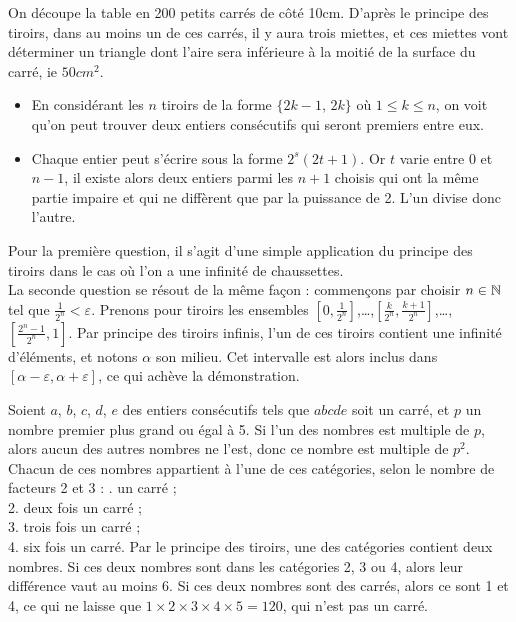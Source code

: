\begin{sol}
On découpe la table en 200 petits carrés de côté 10cm. D'après le principe des tiroirs, dans au moins un de ces carrés, il y aura trois miettes, et ces miettes vont déterminer un triangle dont l'aire sera inférieure à la moitié de la surface du carré, ie $50cm^2$.
\end{sol}


\begin{sol}
\begin{itemize}
    \item En considérant les $n$ tiroirs de la forme $\{2k-1, \, 2k\}$ où $1 \le k \le n$, on voit qu'on peut trouver deux entiers consécutifs qui seront premiers entre eux.
    \item Chaque entier peut s'écrire sous la forme $2^s(2t+1)$. Or $t$ varie entre $0$ et $n-1$, il existe alors deux entiers parmi les $n + 1$ choisis qui ont la même partie impaire et qui ne diffèrent que par la puissance de 2. L'un divise donc l'autre.
\end{itemize}
\end{sol}


\begin{sol}
Pour la première question, il s'agit d'une simple application du principe des tiroirs dans le cas où l'on a une infinité de chaussettes.\\
La seconde question se résout de la même façon : commençons par choisir $n\in\mathbb N$ tel que $\frac{1}{2^n}<\varepsilon$. Prenons pour tiroirs les ensembles $\left[0,\frac1{2^n}\right]$,\dots,$\left[\frac{k}{2^n},\frac{k+1}{2^n}\right]$,\dots,$\left[\frac{2^n-1}{2^n},1\right]$. Par principe des tiroirs infinis, l'un de ces tiroirs contient une infinité d'éléments, et notons $\alpha$ son milieu. Cet intervalle est alors inclus dans $[\alpha-\varepsilon,\alpha+\varepsilon]$, ce qui achève la démonstration.
\end{sol}

\begin{sol}
Soient $a$, $b$, $c$, $d$, $e$ des entiers consécutifs tels que $abcde$ soit un carré, et $p$ un nombre premier plus grand ou égal à 5. Si l’un des nombres est multiple de $p$, alors aucun des autres nombres ne l’est, donc ce nombre est multiple de $p^2$.
\smallskip
\newline
Chacun de ces nombres appartient à l’une de ces catégories, selon le nombre de facteurs 2 et 3 :
. un carré ;\\
2. deux fois un carré ;\\
3. trois fois un carré ;\\
4. six fois un carré.
\smallskip
\newline
Par le principe des tiroirs, une des catégories contient deux nombres. Si ces deux nombres sont dans les catégories 2, 3 ou 4, alors leur différence vaut au moins 6.
\newline
Si ces deux nombres sont des carrés, alors ce sont 1 et 4, ce qui ne laisse que $1 \times 2 \times 3 \times 4 \times 5 = 120$, qui n’est pas un carré.
\end{sol}

